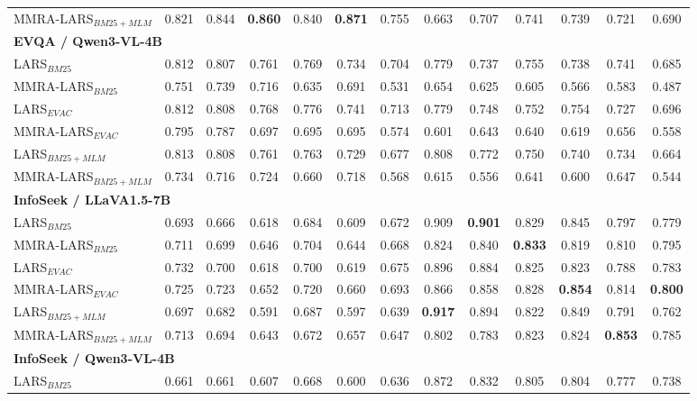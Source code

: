 \begin{table}[t]
\begin{tabular}{l|cccccc|cccccc}
MMRA-LARS$_{BM25+MLM}$ & 0.821 & 0.844 & \textbf{0.860} & 0.840 & \textbf{0.871} & 0.755 & 0.663 & 0.707 & 0.741 & 0.739 & 0.721 & 0.690 \\
\multicolumn{13}{l}{\hspace{0.3em}\textbf{EVQA / Qwen3-VL-4B}} \\
LARS$_{BM25}$ & 0.812 & 0.807 & 0.761 & 0.769 & 0.734 & 0.704 & 0.779 & 0.737 & 0.755 & 0.738 & 0.741 & 0.685 \\
MMRA-LARS$_{BM25}$ & 0.751 & 0.739 & 0.716 & 0.635 & 0.691 & 0.531 & 0.654 & 0.625 & 0.605 & 0.566 & 0.583 & 0.487 \\
LARS$_{EVAC}$ & 0.812 & 0.808 & 0.768 & 0.776 & 0.741 & 0.713 & 0.779 & 0.748 & 0.752 & 0.754 & 0.727 & 0.696 \\
MMRA-LARS$_{EVAC}$ & 0.795 & 0.787 & 0.697 & 0.695 & 0.695 & 0.574 & 0.601 & 0.643 & 0.640 & 0.619 & 0.656 & 0.558 \\
LARS$_{BM25+MLM}$ & 0.813 & 0.808 & 0.761 & 0.763 & 0.729 & 0.677 & 0.808 & 0.772 & 0.750 & 0.740 & 0.734 & 0.664 \\
MMRA-LARS$_{BM25+MLM}$ & 0.734 & 0.716 & 0.724 & 0.660 & 0.718 & 0.568 & 0.615 & 0.556 & 0.641 & 0.600 & 0.647 & 0.544 \\
\multicolumn{13}{l}{\hspace{0.3em}\textbf{InfoSeek / LLaVA1.5-7B}} \\
LARS$_{BM25}$ & 0.693 & 0.666 & 0.618 & 0.684 & 0.609 & 0.672 & 0.909 & \textbf{0.901} & 0.829 & 0.845 & 0.797 & 0.779 \\
MMRA-LARS$_{BM25}$ & 0.711 & 0.699 & 0.646 & 0.704 & 0.644 & 0.668 & 0.824 & 0.840 & \textbf{0.833} & 0.819 & 0.810 & 0.795 \\
LARS$_{EVAC}$ & 0.732 & 0.700 & 0.618 & 0.700 & 0.619 & 0.675 & 0.896 & 0.884 & 0.825 & 0.823 & 0.788 & 0.783 \\
MMRA-LARS$_{EVAC}$ & 0.725 & 0.723 & 0.652 & 0.720 & 0.660 & 0.693 & 0.866 & 0.858 & 0.828 & \textbf{0.854} & 0.814 & \textbf{0.800} \\
LARS$_{BM25+MLM}$ & 0.697 & 0.682 & 0.591 & 0.687 & 0.597 & 0.639 & \textbf{0.917} & 0.894 & 0.822 & 0.849 & 0.791 & 0.762 \\
MMRA-LARS$_{BM25+MLM}$ & 0.713 & 0.694 & 0.643 & 0.672 & 0.657 & 0.647 & 0.802 & 0.783 & 0.823 & 0.824 & \textbf{0.853} & 0.785 \\
\multicolumn{13}{l}{\hspace{0.3em}\textbf{InfoSeek / Qwen3-VL-4B}} \\
LARS$_{BM25}$ & 0.661 & 0.661 & 0.607 & 0.668 & 0.600 & 0.636 & 0.872 & 0.832 & 0.805 & 0.804 & 0.777 & 0.738 \\

\end{tabular}
\end{table}
